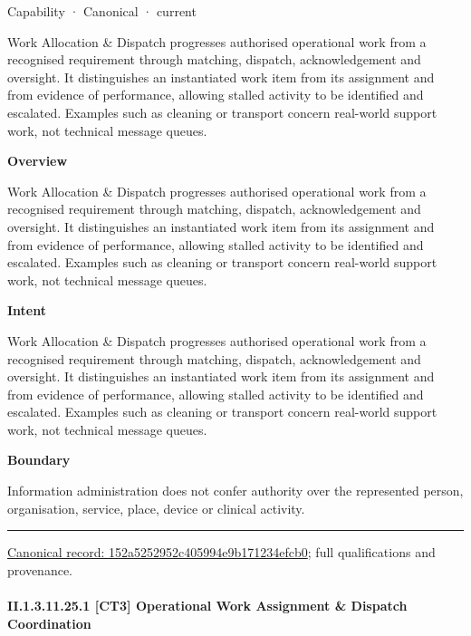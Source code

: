 \label{element:152a5252952c405994e9b171234efcb0}
{\small Capability · Canonical · current}\par

Work Allocation \& Dispatch progresses authorised operational work from a recognised requirement through matching, dispatch, acknowledgement and oversight. It distinguishes an instantiated work item from its assignment and from evidence of performance, allowing stalled activity to be identified and escalated. Examples such as cleaning or transport concern real-world support work, not technical message queues.



\textbf{Overview}



Work Allocation \& Dispatch progresses authorised operational work from a recognised requirement through matching, dispatch, acknowledgement and oversight. It distinguishes an instantiated work item from its assignment and from evidence of performance, allowing stalled activity to be identified and escalated. Examples such as cleaning or transport concern real-world support work, not technical message queues.



\textbf{Intent}



Work Allocation \& Dispatch progresses authorised operational work from a recognised requirement through matching, dispatch, acknowledgement and oversight. It distinguishes an instantiated work item from its assignment and from evidence of performance, allowing stalled activity to be identified and escalated. Examples such as cleaning or transport concern real-world support work, not technical message queues.



\textbf{Boundary}



Information administration does not confer authority over the represented person, organisation, service, place, device or clinical activity.



\medskip\hrule\medskip

{\footnotesize \href{../../../../continuum/strategy/capability/152a5252952c405994e9b171234efcb0.md}{Canonical record: 152a5252952c405994e9b171234efcb0}; full qualifications and provenance.}\par
\paragraph*{II.1.3.11.25.1 [CT3] Operational Work Assignment \& Dispatch Coordination}
\label{navigation:II.1.3.11.25.1}

